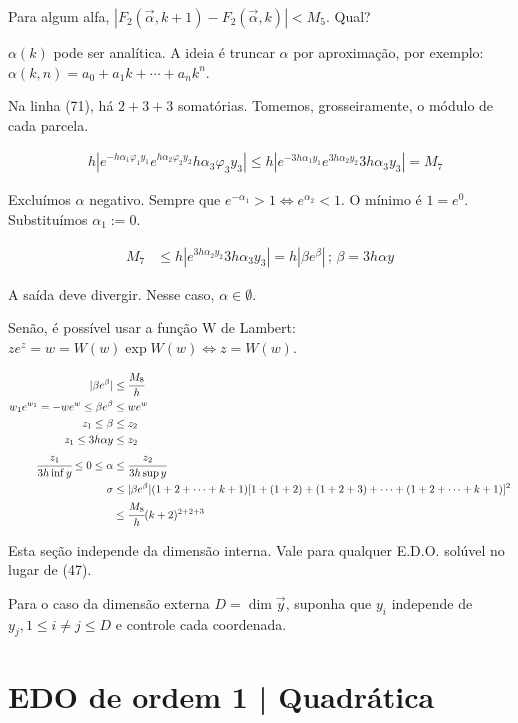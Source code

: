 \documentclass[11pt]{article}
\begin{document}
Para algum alfa, $|F_2( \vec \alpha, k+1) - F_2( \vec \alpha, k)| < M_5$. Qual?

$\alpha(k)$ pode ser anal\'itica. A ideia \'e truncar $\alpha$ por aproxima\c{c}\~ao, por exemplo: $\alpha(k, n) = a_0 + a_1 k + \cdots + a_n k^n$.

Na linha (71), h\'a $2+3+3$ somat\'orias. Tomemos, grosseiramente, o m\'odulo de cada parcela.

\begin{align}
  &h |e^{- h \alpha_1 \varphi_1 y_1}e^{ h \alpha_2 \varphi_2 y_2} h \alpha_3 \varphi_3 y_3| \le h |e^{- 3h \alpha_1 y_1}e^{ 3h \alpha_2 y_2} 3h \alpha_3 y_3| = M_7
\end{align}

Exclu\'imos $\alpha$ negativo. Sempre que $e^{-\alpha_1} > 1 \Leftrightarrow e^{\alpha_2} < 1$. O m\'inimo \'e $1 = e^0$. Substitu\'imos $\alpha_1 := 0$.

\begin{align}
  M_7 &\le h |e^{ 3h \alpha_2 y_2} 3h \alpha_3 y_3| = h | \beta e^{\beta} |\,;\, \beta = 3h \alpha y
\end{align}

A sa\'ida deve divergir. Nesse caso, $\alpha \in \emptyset$.

Sen\~ao, \'e poss\'ivel usar a fun\c{c}\~ao W de Lambert: $z e^z = w = W(w) \exp W(w) \Leftrightarrow z = W(w)$.

\begin{align}
  | \beta e^{\beta} | &\le \cfrac{M_8}{h}  \\
  w_1 e^{w_1} = - w e^w \le \beta e^{\beta} &\le w e^w \\
  z_1 \le \beta &\le z_2 \\
  z_1 \le 3h \alpha y &\le z_2 \\
  \cfrac{z_1}{3h\inf y} \le 0 \le \alpha &\le \cfrac{z_2}{3h\sup y} \\
  \sigma &\le | \beta e^{\beta} | (1+2+\cdots+k+1)[1 + (1 + 2) + (1 + 2 + 3) + \cdots + (1 + 2 + \cdots + k + 1)]^2 \\
  &\le \cfrac{M_8}{h} (k + 2)^{2+2+3}
\end{align}

Esta se\c{c}\~ao independe da dimens\~ao interna. Vale para qualquer E.D.O. sol\'uvel no lugar de (47).

Para o caso da dimens\~ao externa $D = \dim \vec y$, suponha que $y_i$ independe de $y_j, 1 \le i \ne j \le D$ e controle cada coordenada.

\section{EDO de ordem 1 | Quadr\'atica}
\end{document}
